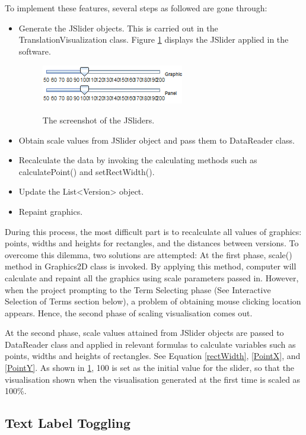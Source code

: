 To implement these features, several steps as followed are gone through:
\begin{itemize}
	\item \textbf{} Generate the JSlider objects. This is carried out in the TranslationVisualization class. Figure \ref{fig:jSliders} displays the JSlider applied in the software.
	\begin{figure}[H]
		\centering	
		\includegraphics[scale=1]{Figs/JSliders}\\[1ex]
		\caption{The screenshot of the JSliders.}
		\label{fig:jSliders}
	\end{figure} 	
	\item \textbf{} Obtain scale values from JSlider object and pass them to DataReader class.
	\item \textbf{} Recalculate the data by invoking the calculating methods such as calculatePoint() and setRectWidth().
	\item \textbf{} Update the List<Version> object.
	\item \textbf{} Repaint graphics.
\end{itemize} 
 
During this process, the most difficult part is to recalculate all values of graphics: points, widths and heights for rectangles, and the distances between versions. To overcome this dilemma, two solutions are attempted:
At the first phase, scale() method in Graphics2D class is invoked. By applying this method, computer will calculate and repaint all the graphics using scale parameters passed in. However, when the project prompting to the Term Selecting phase (See Interactive Selection of Terms section below), a problem of obtaining mouse clicking location appears. Hence, the second phase of scaling visualisation comes out.  

At the second phase, scale values attained from JSlider objects are passed to DataReader class and applied in relevant formulas to calculate variables such as points, widths and heights of rectangles. See Equation \eqref{rectWidth}, \eqref{PointX}, and \eqref{PointY}. As shown in \ref{fig:jSliders}, 100 is set as the initial value for the slider, so that the visualisation shown when the visualisation generated at the first time is scaled as 100\%. 
\subsection{Text Label Toggling}

